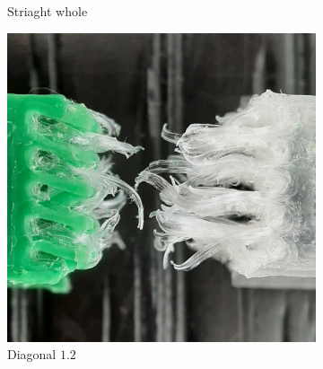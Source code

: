 \begin{figure}
\begin{subfigure}[B]{.28\columnwidth}
		\caption{Striaght whole}
		\label{fig:failures_whole}
	\end{subfigure}
	\begin{subfigure}[B]{.28\columnwidth}
		\centering
		\includegraphics[height=\figheight]{sources/testing/v1_cropped.jpg}
		\caption{Diagonal $1.2$}
		\label{fig:failures_diagonal}
	\end{subfigure}
	\begin{subfigure}[B]{.18\columnwidth}
		\centering

\end{subfigure}
\end{figure}
